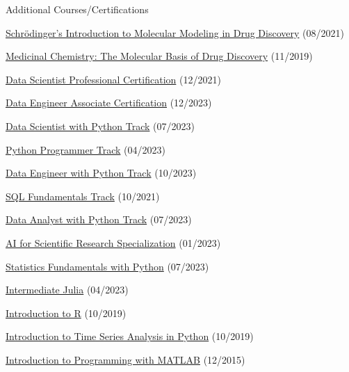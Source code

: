\begin{cventries}
  \cventry
    {}
    {Additional Courses/Certifications}
    {}
    {}
    {
        \begin{cvitems}
            \item{\href{https://api.badgr.io/public/assertions/zZ7-bHnkTcm6H_UNr2s-LA}{Schrödinger's Introduction to Molecular Modeling in Drug Discovery} (08/2021)}           
            \item{\href{https://courses.edx.org/certificates/27307d91954041dab94af0ff554bc378}{Medicinal Chemistry: The Molecular Basis of Drug Discovery} (11/2019)}
            \item{\href{https://www.datacamp.com/certificate/DS0010628355005}{Data Scientist Professional Certification} (12/2021)}            
            \item{\href{https://www.datacamp.com/certificate/DEA0011913814162}{Data Engineer Associate Certification} (12/2023)}
            \item{\href{https://www.datacamp.com/completed/statement-of-accomplishment/track/c9974f934dc76c2b60c6933458476001728dda93}{Data Scientist with Python Track} (07/2023)}
            \item{\href{https://www.datacamp.com/statement-of-accomplishment/track/546928503f3ccea8a2ef53a6040f43997381f967}{Python Programmer Track} (04/2023)}
            \item{\href{https://www.datacamp.com/completed/statement-of-accomplishment/track/fb10963085f36d129d1ac686f14acd5bb255d33d}{Data Engineer with Python Track} (10/2023)}
            \item{\href{https://www.datacamp.com/statement-of-accomplishment/track/941904e6394e2951693441d466f4643e5edfb4de}{SQL Fundamentals Track} (10/2021)}
            \item{\href{https://www.datacamp.com/completed/statement-of-accomplishment/track/4d9fb22f2514baecb5866aecd4421ba951e418a1}{Data Analyst with Python Track} (07/2023)}
            \item{\href{https://www.coursera.org/account/accomplishments/specialization/XU23J53N3SAW}{AI for Scientific Research Specialization} (01/2023)}
            \item{\href{https://www.datacamp.com/completed/statement-of-accomplishment/track/f6b840f135825806cde25b622730d804b8e9b987}{Statistics Fundamentals with Python} (07/2023)}                        
            \item{\href{https://www.datacamp.com/statement-of-accomplishment/course/930a810eaf9c88d856429bfabf33cb9df57e2046}{Intermediate Julia} (04/2023)}
            \item{\href{https://www.datacamp.com/statement-of-accomplishment/course/dd5746b9564cf374bcc0bb379e1801925e25259e}{Introduction to R} (10/2019)}
            \item{\href{https://www.datacamp.com/statement-of-accomplishment/course/807548ea866063da3c0083afcebf3be48d44f277}{Introduction to Time Series Analysis in Python} (10/2019)}
            \item {\href{https://www.coursera.org/account/accomplishments/verify/9G7V69L6QP}{Introduction to Programming with MATLAB} (12/2015)}
        \end{cvitems}      
    }

\end{cventries}
